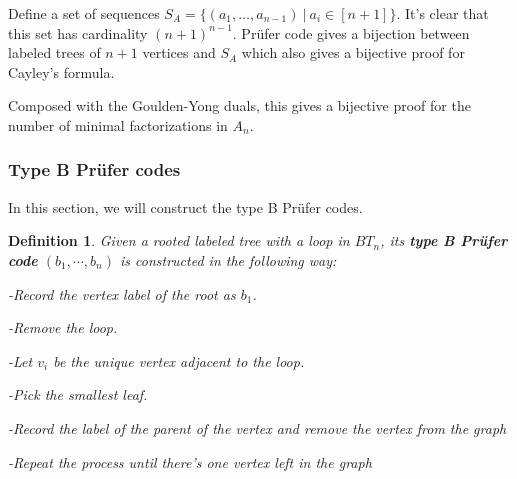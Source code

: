 \documentclass[11pt]{amsart}
\newtheorem{defi}[thm]{Definition}%
\begin{document}
Define a set of sequences $S_A=\{(a_1,\dots,a_{n-1}) \ | \ a_i \in [n+1]\}$. It's clear that this set has cardinality $(n+1)^{n-1}$. Pr\"{u}fer code gives a bijection between labeled trees of $n+1$ vertices and $S_A$ which also gives a bijective proof for Cayley's formula. 

Composed with the Goulden-Yong duals, this gives a bijective proof for the number of minimal factorizations in $A_n$.

\subsubsection{Type B Pr\"{u}fer codes}

In this section, we will construct the type B Pr\"{u}fer codes.

\begin{defi}
    Given a rooted labeled tree with a loop in $BT_n$, its \textbf{type B Pr\"{u}fer code} $(b_1,\cdots,b_n)$ is constructed in the following way:

    -Record the vertex label of the root as $b_1$.

    -Remove the loop.

    -Let $v_i$ be the unique vertex adjacent to the loop. 
    
    -Pick the smallest leaf.

    -Record the label of the parent of the vertex and remove the vertex from the graph

    -Repeat the process until there's one vertex left in the graph
\end{defi}
\end{document}
